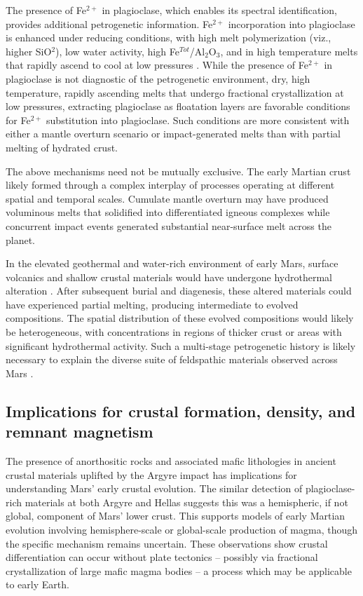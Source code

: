 \documentclass[12pt]{article}
\begin{document}
The presence of Fe$^{2+}$ in plagioclase, which enables its spectral identification, provides additional petrogenetic information. Fe$^{2+}$ incorporation into plagioclase is enhanced under reducing conditions, with high melt polymerization (viz., higher SiO$^2$), low water activity, high Fe$^{Tot}$/Al$_{2}$O$_{3}$, and in high temperature melts that rapidly ascend to cool at low pressures \citep{Wenk1973, Longhi1976, Smith1988, Phinney1992, Ashwal1993, Lundgaard2004}. While the presence of Fe$^{2+}$ in plagioclase is not diagnostic of the petrogenetic environment, dry, high temperature, rapidly ascending melts that undergo fractional crystallization at low pressures, extracting plagioclase as floatation layers are favorable conditions for Fe$^{2+}$ substitution into plagioclase. Such conditions are more consistent with either a mantle overturn scenario or impact-generated melts than with partial melting of hydrated crust.

The above mechanisms need not be mutually exclusive. The early Martian crust likely formed through a complex interplay of processes operating at different spatial and temporal scales. Cumulate mantle overturn may have produced voluminous melts that solidified into differentiated igneous complexes while concurrent impact events generated substantial near-surface melt across the planet.

In the elevated geothermal and water-rich environment of early Mars, surface volcanics and shallow crustal materials would have undergone hydrothermal alteration \citep{Viviano2019}. After subsequent burial and diagenesis, these altered materials could have experienced partial melting, producing intermediate to evolved compositions. The spatial distribution of these evolved compositions would likely be heterogeneous, with concentrations in regions of thicker crust or areas with significant hydrothermal activity. Such a multi-stage petrogenetic history is likely necessary to explain the diverse suite of feldspathic materials observed across Mars \citep{Carter2013, Wray2013, Rogers2015, Viviano-Beck2017, Farrand2021, Payre2022, Payre2024, Phillips2022, Flahaut2023, Michalski2023}.

\subsection*{Implications for crustal formation, density, and remnant magnetism}

The presence of anorthositic rocks and associated mafic lithologies in ancient crustal materials uplifted by the Argyre impact has implications for understanding Mars' early crustal evolution. The similar detection of plagioclase-rich materials at both Argyre and Hellas \citep{Phillips2022} suggests this was a hemispheric, if not global, component of Mars' lower crust. This supports models of early Martian evolution involving hemisphere-scale or global-scale production of magma, though the specific mechanism remains uncertain. These observations show crustal differentiation can occur without plate tectonics -- possibly via fractional crystallization of large mafic magma bodies -- a process which may be applicable to early Earth.
\end{document}
